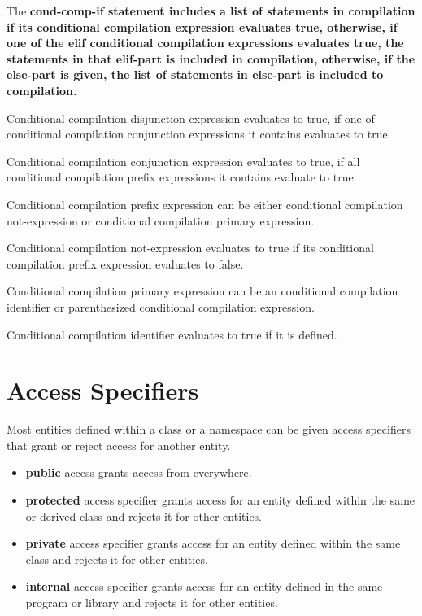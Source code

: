 \documentclass[a4paper,oneside,11pt]{article}
\begin{document}
The \bf{cond-comp-if} statement includes a list of statements in compilation
if its conditional compilation expression evaluates true,
otherwise, if one of the \bf{elif} conditional compilation expressions evaluates true,
the statements in that \bf{elif}-part is included in compilation, otherwise,
if the \bf{else}-part is given, the list of statements in \bf{else}-part is
included to compilation.

Conditional compilation disjunction expression evaluates to true,
if one of conditional compilation conjunction expressions it contains evaluates to true.

Conditional compilation conjunction expression evaluates to true,
if all conditional compilation prefix expressions it contains evaluate to true.

Conditional compilation prefix expression can be either conditional compilation not-expression
or conditional compilation primary expression.

Conditional compilation not-expression evaluates to true if its conditional compilation
prefix expression evaluates to false.

Conditional compilation primary expression can be an conditional compilation identifier or
parenthesized conditional compilation expression.

Conditional compilation identifier evaluates to true if it is defined.

\section{Access Specifiers}\label{accessspecifier}

Most entities defined within a class or a namespace can be given access specifiers that grant or reject access for another entity.

\begin{itemize}
\item{\bf{public}} access grants access from everywhere.

\item{\bf{protected}} access specifier grants access for an entity defined within the same or derived class and rejects it for other entities.

\item{\bf{private}} access specifier grants access for an entity defined within the same class and rejects it for other entities.

\item{\bf{internal}} access specifier grants access for an entity defined in the same program or library and rejects it for other entities.
\end{itemize}
\end{document}
